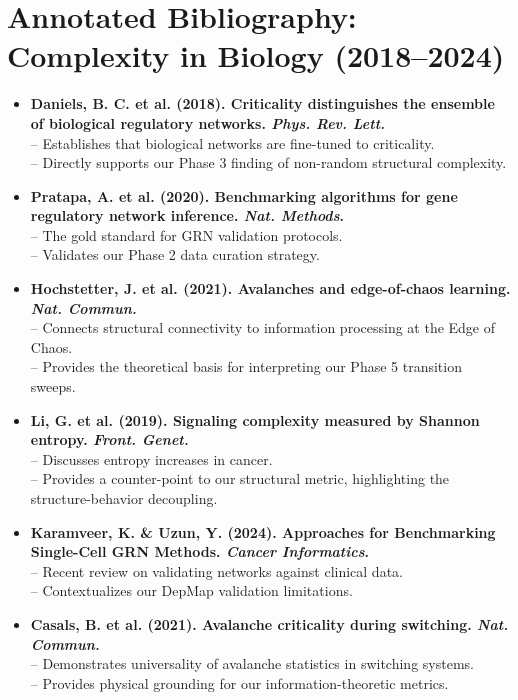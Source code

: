 \documentclass{article}
\begin{document}
\section*{Annotated Bibliography: Complexity in Biology (2018--2024)}
\begin{itemize}
    \item \textbf{Daniels, B. C. et al. (2018). Criticality distinguishes the ensemble of biological regulatory networks. \textit{Phys. Rev. Lett.}} \\
    -- Establishes that biological networks are fine-tuned to criticality.\\
    -- Directly supports our Phase 3 finding of non-random structural complexity.
    
    \item \textbf{Pratapa, A. et al. (2020). Benchmarking algorithms for gene regulatory network inference. \textit{Nat. Methods}.} \\
    -- The gold standard for GRN validation protocols.\\
    -- Validates our Phase 2 data curation strategy.
    
    \item \textbf{Hochstetter, J. et al. (2021). Avalanches and edge-of-chaos learning. \textit{Nat. Commun.}} \\
    -- Connects structural connectivity to information processing at the Edge of Chaos.\\
    -- Provides the theoretical basis for interpreting our Phase 5 transition sweeps.
    
    \item \textbf{Li, G. et al. (2019). Signaling complexity measured by Shannon entropy. \textit{Front. Genet.}} \\
    -- Discusses entropy increases in cancer.\\
    -- Provides a counter-point to our structural metric, highlighting the structure-behavior decoupling.
    
    \item \textbf{Karamveer, K. \& Uzun, Y. (2024). Approaches for Benchmarking Single-Cell GRN Methods. \textit{Cancer Informatics}.} \\
    -- Recent review on validating networks against clinical data.\\
    -- Contextualizes our DepMap validation limitations.

    \item \textbf{Casals, B. et al. (2021). Avalanche criticality during switching. \textit{Nat. Commun.}} \\
    -- Demonstrates universality of avalanche statistics in switching systems.\\
    -- Provides physical grounding for our information-theoretic metrics.


\end{itemize}
\end{document}
